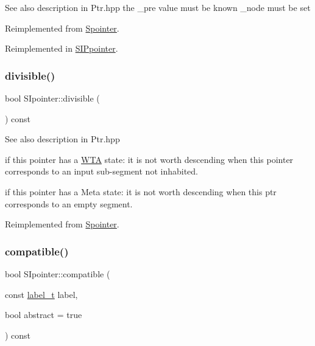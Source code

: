 \begin{DoxySeeAlso}{See also}
description in Ptr.\+hpp the \+\_\+pre value must be known \+\_\+node must be set 
\end{DoxySeeAlso}


Reimplemented from \mbox{\hyperlink{group__table_ga15067ad809b5ac25b45c0187550e0b17}{Spointer}}.



Reimplemented in \mbox{\hyperlink{group__table_ga7f7cd8ae86d71b147fc662d3cc4977c0}{S\+I\+Ppointer}}.

\mbox{\label{group__table_gac83e0619c17ce4efd589f73513706a6b}} 
\subsubsection{\texorpdfstring{divisible()}{divisible()}\hspace{0.1cm}{\footnotesize\ttfamily [2/2]}}
{\footnotesize\ttfamily bool S\+Ipointer\+::divisible (\begin{DoxyParamCaption}{ }\end{DoxyParamCaption}) const\hspace{0.3cm}{\ttfamily [virtual]}}

\begin{DoxySeeAlso}{See also}
description in Ptr.\+hpp
\end{DoxySeeAlso}
if this pointer has a \mbox{\hyperlink{classWTA}{W\+TA}} state\+: it is not worth descending when this pointer corresponds to an input sub-\/segment not inhabited.

if this pointer has a Meta state\+: it is not worth descending when this ptr corresponds to an empty segment. 

Reimplemented from \mbox{\hyperlink{group__table_ga54817fbae1688dab4dfff5724e762640}{Spointer}}.

\mbox{\label{group__table_gaca7d3c4d141ecf2874a5e5512e0c02ff}} 
\subsubsection{\texorpdfstring{compatible()}{compatible()}\hspace{0.1cm}{\footnotesize\ttfamily [1/2]}}
{\footnotesize\ttfamily bool S\+Ipointer\+::compatible (\begin{DoxyParamCaption}\item[{const \mbox{\hyperlink{group__output_ga22fde970e635fcf63962743b2d5c441d}{label\+\_\+t}}}]{label,  }\item[{bool}]{abstract = {\ttfamily true} }\end{DoxyParamCaption}) const\hspace{0.3cm}{\ttfamily [virtual]}}

